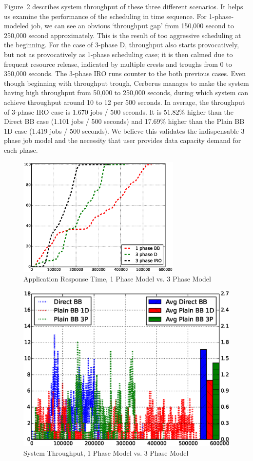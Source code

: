 Figure~\ref{Fig:3Pvs1PThroughput} describes system throughput of these three different scenarios.
It helps us examine the performance of the scheduling in time sequence.
For 1-phase-modeled job, we can see an obvious `throughput gap'
from 150,000 second to 250,000 second approximately.
This is the result of too aggressive scheduling at the beginning.
For the case of 3-phase D, throughput also starts provocatively,
but not as provocatively as 1-phase scheduling case;
it is then calmed due to frequent resource release,
indicated by multiple crests and troughs from 0 to 350,000 seconds.
The 3-phase IRO runs counter to the both previous cases.
Even though beginning with throughput trough,
Cerberus manages to make the system having high throughput from 50,000 to 250,000 seconds,
during which system can achieve throughput around 10 to 12 per 500 seconds. 
In average, the throughput of 3-phase IRO case is 1.670 jobs / 500 seconds.
It is 51.82\% higher than the Direct BB case (1.101 jobs / 500 seconds) and
17.69\% higher than the Plain BB 1D case (1.419 jobs / 500 seconds).
We believe this validates the indispensable 3 phase job model and
the necessity that user provides data capacity demand for each phase.


\begin{figure}[!t]
\centering
\includegraphics[width=3.2in]{Draw3Pvs1P/1000jobs_3p_vs_1p_response}
\caption{Application Response Time, 1 Phase Model vs. 3 Phase Model}
\label{Fig:3Pvs1PResponse}
\end{figure}

\begin{figure}[!t]
\centering
\includegraphics[width=7.0in]{Draw3Pvs1P/1000jobs_3p_vs_1p_throughput}
\caption{System Throughput, 1 Phase Model vs. 3 Phase Model}
\label{Fig:3Pvs1PThroughput}
\end{figure}


